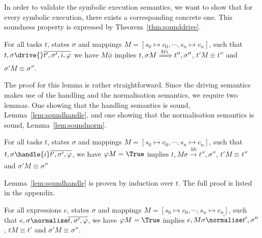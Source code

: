 %

In order to validate the symbolic execution semantics, we want to show that for every symbolic execution, there exists a corresponding concrete one.
This soundness property is expressed by Theorem~\ref{thm:sounddrive}.

\begin{theorem}
  \label{thm:sounddrive}

  For all tasks $t$, states $\sigma$ and mappings $M=[s_0\mapsto c_0,\cdots,s_n\mapsto c_n]$,
  such that $t,\sigma\drive{} \overline{t',\sigma',i,\phi}$
  we have $M\phi$ implies
  $t,\sigma M \xRightarrow[]{M i} t'',\sigma''$, $t'M \equiv t''$ and $\sigma' M \equiv \sigma''$.
\end{theorem}

The proof for this lemma is rather straightforward.
Since the driving semantics makes use of the handling and the normalisation semantics, we require two lemmas.
One showing that the handling semantics is sound, Lemma~\ref{lem:soundhandle}, and one showing that the normalisation semantics is sound, Lemma~\ref{lem:soundnorm}.

\begin{lemma}
  \label{lem:soundhandle}

  For all tasks $t$, states $\sigma$ and mappings $M = [s_0\mapsto c_0,\cdots,s_n\mapsto c_n]$,
  such that $t,\sigma\handle{i} \overline{t',\sigma',\phi}$,
  we have $\phi M = \True$ implies
  $t,M \sigma \xrightarrow[]{M i} t'',\sigma''$, $t'M \equiv t'' $ and $\sigma' M \equiv \sigma''$
\end{lemma}

Lemma~\ref{lem:soundhandle} is proven by induction over $t$.
The full proof is listed in the appendix.

\begin{lemma}
  \label{lem:soundnorm}

  For all expressions $e$, states $\sigma$ and mappings $M=[s_0\mapsto c_0,\cdots,s_n\mapsto c_n]$,
  such that $e,\sigma\normalise \overline{t,\sigma',\phi}$,
  we have $\phi M =\True$ implies
  $e,M \sigma \bar{\normalise}t',\sigma''$, $t M \equiv t'$ and $\sigma' M \equiv \sigma''$.

\end{lemma}

